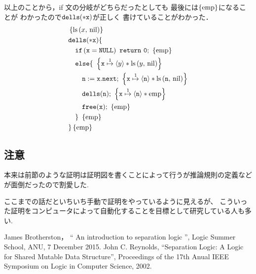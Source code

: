 \documentclass[a4paper, 10pt]{ltjsarticle}
\begin{document}
  以上のことから，if 文の分岐がどちらだったとしても
  最後には$\left\{\mathrm{emp}\right\}$になることが
  わかったので$\mathtt{dells(*x)}$が正しく
  書けていることがわかった．
  \begin{align*}
   &  \left\{\mathprls{x}{\mathvalnil}\right\}\\
   & \mathprogramsy{dells(*x)} \{  \\
   &\quad \mathprogramsy{if\left(x = NULL\right)\ return\ 0;}\ \left\{\mathemp\right\}
   \\
     &\quad   \mathprogramsy{else \{}\  
   \left\{ \mathprogramsy{x} \mathpointer{1} \left\langle y \right\rangle * \mathprls{y}{\mathvalnil}  \right\} \\
     &\qquad  \mathprogramsy{n := x.next;}\  \left\{ \mathprogramsy{x} \mathpointer{1} \left\langle \mathprogramsy{n} \right\rangle * \mathprls{\mathprogramsy{n}}{\mathvalnil}  \right\} \\
     &\qquad  \mathprogramsy{dells(n);}\ \left\{ \mathprogramsy{x} \mathpointer{1} \left\langle \mathprogramsy{n} \right\rangle * \mathemp \right\} \\
      &\qquad  \mathprogramsy{free(x);}\ \left\{ \mathemp \right\} \\
      &\quad \mathprogramsy{\}}\ \left\{ \mathemp \right\} \\
      &\mathprogramsy{\}} \left\{\mathemp\right\}
  \end{align*}

  \subsection*{注意}

  本来は前節のような証明は証明図を書くことによって行うが推論規則の定義などが面倒だったので割愛した.

  ここまでの話だといちいち手動で証明をやっているように見えるが、
  こういった証明をコンピュータによって自動化することを目標として研究している人も多い.

  \begin{thebibliography}{9}
    James Brotherston，
	   `` An introduction to separation logic '', 
	   Logic Summer School, ANU, 7 December 2015.
    John C. Reynolds, ``Separation Logic: A Logic for Shared Mutable Data Structure'', Proceedings of the 17th Anual IEEE Symposium on Logic in Computer Science, 2002.
  \end{thebibliography} 
\end{document}
